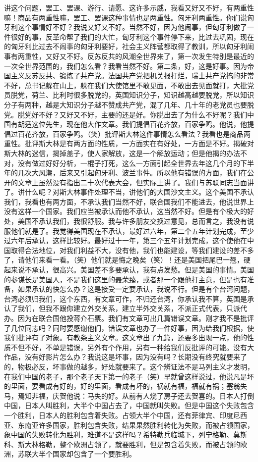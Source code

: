 讲这个问题，罢工、罢课、游行、请愿、这许多示威，我看又好又不好，有两重性嘛！商品有两重性嘛，罢工、罢课这种事情也是两重性。匈牙利两重性。你们说匈牙利这个事情好不好？我说又好又不好。当然不好，因为他闹事，但匈牙利做了一件很好的事，反革命帮了我们的大忙，匈牙利这个事件停下来，比过去巩固，现在的匈牙利比过去不闹事的匈牙利要好，社会主义阵营都取得了教训，所以匈牙利闹事有两重性，又好又不好。反苏反共的风潮全世界来了，第一次发生特别是最近的一次全世界范围的，我们怎么看？我看当然不好。第二条，好，这是好事。因为帝国主义反苏反共、锻炼了共产党。法国共产党把机关报打烂，瑞士共产党搞的非常不好，总书记躲在山上，躲在我们大使馆里不敢见面，不敢出去见面就打，大批党员脱党，荷兰、比利时很多脱党的，英国知识分子，知识越高越要脱党，所以知识分子有两种，越是大知识分子越不赞成共产党，混了几年、几十年的老党员也要脱党。脱党好不好？又好又不好，主要的还是好。你脱出去了为什么不好呢？我们中国有胡适这位先生，现在他大作文章。我们提倡百花齐放，百家争鸣。他说，他提倡过百花齐放，百家争鸣。（笑）批评斯大林这件事情怎么看法？我看也是商品两重性。批评斯大林是有两方面的性质，一方面实在有好处，一方面是不好。揭破对斯大林的迷信，揭掉盖子，使人家解放，这是一个解放运动；但是他揭的办法不对，没有做过好好分析，一棍子打死，这么一方面引起全世界去年这几个月的下半年的几次大风潮，后来又引起匈牙利、波兰事件。所以他有错误的方面，我们在公开的文章上虽然没有指出二十次代表大会，但实际上讲了。我们与苏联同志当面讲了。讲什么呢？对斯大林事件处理不当，讲他们的大国沙文主义。这个美国不承认我们，我看也有两方面，不承认我们当然不好，联合国我们不能进去，他说世界上没有这样一个国家。我们应当被承认而他不承认，这当然不好。但是有个极大的好处，美国不承认我们，我很舒服。我与许多朋友交换过意见，总而言之，我没有说服他们就是了。我觉得美国现在不承认，最好过六年，第二个五年计划完成，至少过六年后承认，这样比较好。最好过十一年，第三个五年计划完成，这个使他在中国取得合法地位，对我们利益不大，没有他，我们也能建设，等我们建设的差不多了，请他们来看一看。（笑）他们就是悔之晚矣（笑）！还是美国把尾巴一翘，硬起来说不承认，很高兴。美国差不多要承认，我有点发愁。但是美国的事情。美国的参谋长是美国人，不是我们这里的聂荣臻，或者那一个跟他打主意，但是也有准备，如果承认的快怎么办？这是接受一定要承认，我说不行。但是有个台湾问题，台湾必须归我们，这个东西，有文章可作，不归还台湾，你承认我不算，英国是承认了我们，但我不跟你建立外交关系，建立半外交关系，不派正式代表，只派代办。因为在联合国他投蒋介石票。我们有文章可出几篇错误文章。刚才我不是批评了几位同志吗？同时要感谢他们，错误文章也办了一件好事，因为给我们根据，使我们批评有了对象。有教条主义文章。这文章出了九篇，还要多出现一点，他的性质不但不好，不单是错误，另外有个作用，另有一种给我们反批评的可能。没有大作品，没有好影片怎么办？我说这是坏事，因为没有吗？长期没有终究就要来了的，物极必反，坏事做的越多，好处就要来了。这个辨证法不是马列主义才发明，在我们中国的老子，那个老子天下第一的老子（笑）早就曾这样说过，他说凡是坏的里面，要看成有好的，好的里面，看成有坏的，祸就有福，福就有祸；塞翁失马，焉知非福，庆贺他说：马失的好。从前有人烧了房子还去贺喜的。日本人打倒中国，日本人叫胜利，大半个中国占去了，中国就叫失败。但是中国这个失败包含一个胜利，日本人的胜利包含着失败。占领大半个中国，还有菲律宾、印度尼西亚、东南亚许多国家，胜利包含失败，结果果然胜利转化为失败，而被占领国家，象中国的失败转化为胜利，难道不是这样吗？希特勒兵临城下，列宁格勒、莫斯科、斯大林格勒，整个欧洲占领了，就要胜利，但是包含着失败，而被占领的欧洲，苏联大半个国家却包含了一个要胜利。

